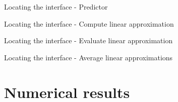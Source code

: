 \documentclass{beamer}  %
\begin{document}
\begin{frame}{Locating the interface - Predictor}
    \begin{figure}
        \centering
        
    \end{figure}
\end{frame}

\begin{frame}{Locating the interface - Compute linear approximation}
    \begin{figure}
        \centering
        
    \end{figure}
\end{frame}

\begin{frame}{Locating the interface - Evaluate linear approximation}
    \begin{figure}
        \centering
        
    \end{figure}
\end{frame}

\begin{frame}{Locating the interface - Average linear approximations}
    \begin{figure}
        \centering
        
    \end{figure}
\end{frame}



\section{Numerical results}
\end{document}
